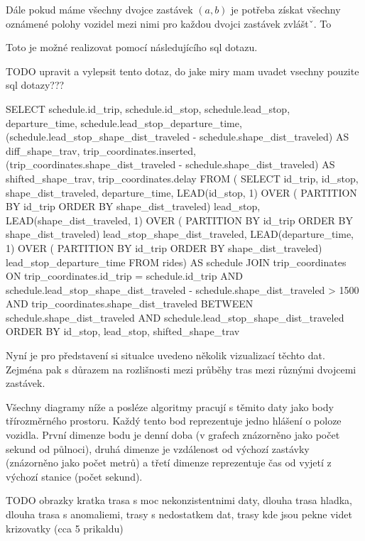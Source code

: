 \bigbreak

 Dále pokud máme všechny dvojce zastávek $(a, b)$ je potřeba získat všechny oznámené polohy vozidel mezi nimi pro každou dvojci zastávek zvláštˇ. To

\bigbreak

Toto je možné realizovat pomocí následujícího \gls{sql} dotazu.

TODO upravit a vylepsit tento dotaz, do jake miry mam uvadet vsechny pouzite sql dotazy???
\begin{code}[frame=none]
SELECT schedule.id_trip,
	schedule.id_stop,
	schedule.lead_stop,
	departure_time,
	schedule.lead_stop_departure_time,
	(schedule.lead_stop_shape_dist_traveled - schedule.shape_dist_traveled)
		AS diff_shape_trav,
	trip_coordinates.inserted,
	(trip_coordinates.shape_dist_traveled - schedule.shape_dist_traveled)
		AS shifted_shape_trav,
	trip_coordinates.delay
FROM (
	SELECT id_trip, id_stop, shape_dist_traveled, departure_time,
		LEAD(id_stop, 1) OVER (
			PARTITION BY id_trip ORDER BY shape_dist_traveled) lead_stop,
		LEAD(shape_dist_traveled, 1) OVER (
			PARTITION BY id_trip ORDER BY shape_dist_traveled) lead_stop_shape_dist_traveled,
		LEAD(departure_time, 1) OVER (
			PARTITION BY id_trip ORDER BY shape_dist_traveled) lead_stop_departure_time
	FROM rides) AS schedule
JOIN trip_coordinates
ON trip_coordinates.id_trip = schedule.id_trip AND
	schedule.lead_stop_shape_dist_traveled - schedule.shape_dist_traveled > 1500 AND
	trip_coordinates.shape_dist_traveled BETWEEN schedule.shape_dist_traveled AND
	schedule.lead_stop_shape_dist_traveled
ORDER BY id_stop, lead_stop, shifted_shape_trav
\end{code}

\bigbreak

Nyní je pro představení si situalce uvedeno několik vizualizací těchto dat. Zejména pak s důrazem na rozlišnosti mezi průběhy tras mezi různými dvojcemi zastávek.

\bigbreak

Všechny diagramy níže a posléze algoritmy pracují s těmito daty jako body třírozměrného prostoru. Každý tento bod reprezentuje jedno hlášení o poloze vozidla. První dimenze bodu je denní doba (v grafech znázorněno jako počet sekund od půlnoci), druhá dimenze je vzdálenost od výchozí zastávky (znázorněno jako počet metrů) a třetí dimenze reprezentuje čas od vyjetí z výchozí stanice (počet sekund).

TODO obrazky kratka trasa s moc nekonzistentnimi daty, dlouha trasa hladka, dlouha trasa s anomaliemi, trasy s nedostatkem dat, trasy kde jsou pekne videt krizovatky (cca 5 prikaldu)


